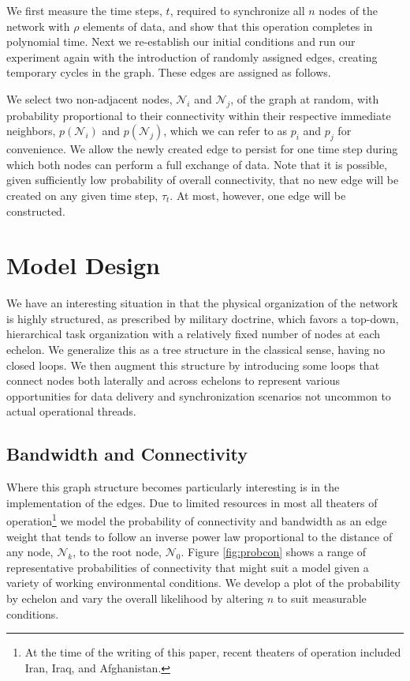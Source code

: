 \documentclass[10pt]{./IEEEtran}
\begin{document}
We first measure the time steps, $t$, required to synchronize all $n$ nodes of the network with $\rho$ elements of data, and show that this operation completes in polynomial time.  Next we re-establish our initial conditions and run our experiment again with the introduction of randomly assigned edges, creating temporary cycles in the graph.  These edges are assigned as follows.

We select two non-adjacent nodes, $\mathscr{N}_{i}$ and $\mathscr{N}_{j}$, of the graph at random, with probability proportional to their connectivity within their respective immediate neighbors, $p(\mathscr{N}_{i})$ and $p(\mathscr{N}_{j})$, which we can refer to as $p_{i}$ and $p_{j}$ for convenience.  We allow the newly created edge to persist for one time step during which both nodes can perform a full exchange of data.  Note that it is possible, given sufficiently low probability of overall connectivity, that no new edge will be created on any given time step, $\tau_{t}$.  At most, however, one edge will be constructed.


\section{Model Design}
\label{sec:model}
We have an interesting situation in that the physical organization of the network is highly structured, as prescribed by military doctrine, which favors a top-down, hierarchical task organization with a relatively fixed number of nodes at each echelon.  We generalize this as a tree structure in the classical sense, having no closed loops.  We then augment this structure by introducing some loops that connect nodes both laterally and across echelons to represent various opportunities for data delivery and synchronization scenarios not uncommon to actual operational threads.

\subsection{Bandwidth and Connectivity}

Where this graph structure becomes particularly interesting is in the implementation of the edges.  Due to limited resources in most all theaters of operation\footnote{At the time of the writing of this paper, recent theaters of operation included Iran, Iraq, and Afghanistan.} we model the probability of connectivity and bandwidth as an edge weight that tends to follow an inverse power law proportional to the distance of any node, $\mathscr{N}_{k}$, to the root node, $\mathscr{N}_{0}$.  Figure \ref{fig:probcon} shows a range of representative probabilities of connectivity that might suit a model given a variety of working environmental conditions.  We develop a plot of the probability by echelon and vary the overall likelihood by altering $n$ to suit measurable conditions.
\end{document}
